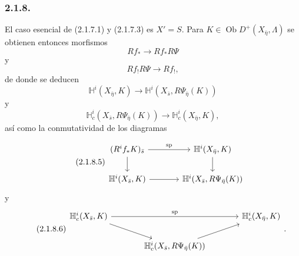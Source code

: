 \subsubsection*{2.1.8.}
El caso esencial de (2.1.7.1) y (2.1.7.3) es $X'=S$. Para
$K\in\operatorname{Ob}D^+(X_{\bar\eta},\Lambda)$ se obtienen entonces
morfismos
\begin{equation}\tag{2.1.8.1}
Rf_*\longrightarrow Rf_*R\Psi
\end{equation}
y
\begin{equation}\tag{2.1.8.2}
Rf_!R\Psi\longrightarrow Rf_!,
\end{equation}
de donde se deducen
\begin{equation}\tag{2.1.8.3}
\mathbb H^i(X_{\bar\eta},K)
\longrightarrow
\mathbb H^i(X_{\bar s},R\Psi_{\bar\eta}(K))
\end{equation}
y
\begin{equation}\tag{2.1.8.4}
\mathbb H_c^i(X_{\bar s},R\Psi_{\bar\eta}(K))
\longrightarrow
\mathbb H_c^i(X_{\bar\eta},K),
\end{equation}
así como la conmutatividad de los diagramas

\pageoriginale

\begin{equation}\tag{2.1.8.5}
\begin{tikzcd}[column sep=large]
(R^if_*K)_{\bar s} \arrow[r, "\mathrm{sp}"] \arrow[d]
  & \mathbb H^i(X_{\bar\eta},K) \arrow[d] \\
\mathbb H^i(X_{\bar s},K) \arrow[r]
  & \mathbb H^i(X_{\bar s},R\Psi_{\bar\eta}(K))
\end{tikzcd}
\end{equation}
y
\begin{equation}\tag{2.1.8.6}
\begin{tikzcd}[column sep=large]
\mathbb H_c^i(X_{\bar s},K) \arrow[rr, "\mathrm{sp}"] \arrow[dr]
  & {} & \mathbb H_c^i(X_{\bar\eta},K) \\
{} & \mathbb H_c^i(X_{\bar s},R\Psi_{\bar\eta}(K)) \arrow[ur] & {}
\end{tikzcd}
.
\end{equation}

